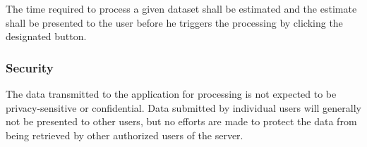 \documentclass[a4paper]{srs}
\begin{document}
The time required to process a given dataset shall be estimated and the estimate 
shall be presented to the user before he triggers the processing by clicking the 
designated button.

\subsubsection{Security}
The data transmitted to the application for processing is not expected to 
be privacy-sensitive or confidential. Data submitted by individual users will 
generally not be presented to other users, but no efforts are made to protect 
the data from being retrieved by other authorized users of the server.
\end{document}
